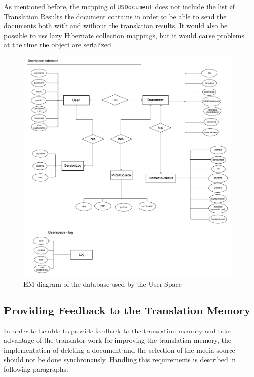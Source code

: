 As mentioned before, the mapping of {\tt USDocument} does not include the list of Translation Results the document contains in order to be able to send the documents both with and without the translation results. It would also be possible to use lazy Hibernate collection mappings, but it would cause problems at the time the object are serialized.

\begin{figure}
\begin{center}
\includegraphics[scale=0.5]{figures/userspacedb.pdf}
\end{center}
\caption{EM diagram of the database used by the User Space}
\label{fig:em_of_us}
\end{figure}

\subsection{Providing Feedback to the Translation Memory}

In order to be able to provide feedback to the translation memory and take advantage of the translator work for improving the translation memory, the implementation of deleting a document and the selection of the media source should not be done synchronously. Handling this requirements is described in following paragraphs.

